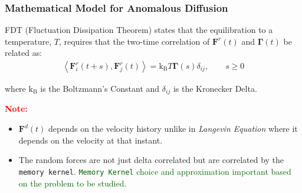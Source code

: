 \documentclass[a4paper,10pt]{beamer}
\newcommand{\BS}[1]{\boldsymbol{#1}}
\newcommand{\angbrac}[1]{\left \langle #1 \right \rangle}
\begin{document}
	\begin{frame}
		\small
		\frametitle{Mathematical Model for Anomalous Diffusion}
		\begin{theorem}
			FDT (Fluctuation Dissipation Theorem) states that the equilibration to a temperature, $T$, requires that the two-time correlation of $\BS{F}^{r}(t)$ and $\BS{\Gamma}(t)$ be related as:
			\begin{align}
				\angbrac{\BS{F}^{r}_{i}(t+s),\BS{F}^{r}_{j}(t)} = \text{k}_{\text{B}} T \BS{\Gamma}(s) \delta_{ij}, \qquad s \geq 0
			\end{align}
		\end{theorem}
		where $\text{k}_{\text{B}}$ is the Boltzmann's Constant and $\delta_{ij}$ is the Kronecker Delta.
		\linebreak
		
		
		\textcolor{red}{\textbf{Note:}}
		\begin{itemize}
			\item {$\BS{F}^{d}(t)$ depends on the velocity history unlike in \textit{Langevin Equation}} where it depends on the velocity at that instant.
			\item {The random forces are not just delta correlated but are correlated by the \texttt{memory kernel}. \textcolor{darkgreen}{\texttt{Memory Kernel} choice and approximation important based on the problem to be studied.}}
		\end{itemize}
	\end{frame}
	
\end{document}
